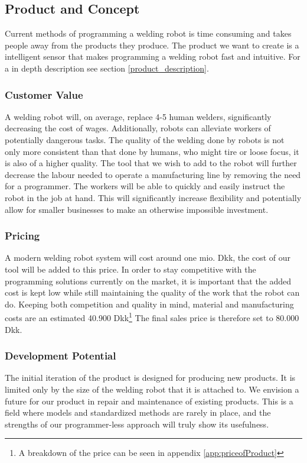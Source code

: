 \subsection{Product and Concept}
Current methods of programming a welding robot is time consuming and takes people away from the products they produce.
The product we want to create is a intelligent sensor that makes programming a welding robot fast and intuitive. 
For a in depth description see section \ref{product_description}.
\subsubsection{Customer Value}
A welding robot will, on average, replace 4-5 human welders, significantly decreasing the cost of wages. Additionally, robots can alleviate workers of potentially dangerous tasks. The quality of the welding done by robots is not only more consistent than that done by humans, who might tire or loose focus, it is also of a higher quality. The tool that we wish to add to the robot will further decrease the labour needed to operate a manufacturing line by removing the need for a programmer. The workers will be able to quickly and easily instruct the robot in the job at hand. This will significantly increase flexibility and potentially allow for smaller businesses to make an otherwise impossible investment.

\subsubsection{Pricing}
A modern welding robot system will cost around one mio. Dkk, the cost of our tool will be added to this price. In order to stay competitive with the programming solutions currently on the market, it is important that the added cost is kept low while still maintaining the quality of the work that the robot can do. Keeping both competition and quality in mind, material and manufacturing costs are an estimated 40.900 Dkk\footnote{A breakdown of the price can be seen in appendix \ref{app:priceofProduct}} 
The final sales price is therefore set to 80.000 Dkk.

\subsubsection{Development Potential}
The initial iteration of the product is designed for producing new products. It is limited only by the size of the welding robot that it is attached to. We envision a future for our product in repair and maintenance of existing products. This is a field where models and standardized methods are rarely in place, and the strengths of our programmer-less approach will truly show its usefulness.

